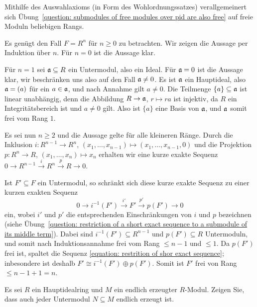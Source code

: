 \begin{remark*}
  Mithilfe des Auswahlaxioms (in Form des Wohlordnungssatzes) verallgemeinert sich Übung~\ref{question: submodules of free modules over pid are also free} auf freie Moduln beliebigen Rangs.
\end{remark*}


\begin{solution}
  Es genügt den Fall $F = R^n$ für $n \geq 0$ zu betrachten.
  Wir zeigen die Aussage per Induktion über $n$.
  Für $n = 0$ ist die Aussage klar.
  
  Für $n = 1$ sei $\mathfrak{a} \subseteq R$ ein Untermodul, also ein Ideal.
  Für $\mathfrak{a} = 0$ ist die Aussage klar, wir beschränken uns also auf den Fall $\mathfrak{a} \neq 0$.
  Es ist $\mathfrak{a}$ ein Hauptideal, also $\mathfrak{a} = (a)$ für ein $a \in \mathfrak{a}$, und nach Annahme gilt $a \neq 0$.
  Die Teilmenge $\{a\} \subseteq \mathfrak{a}$ ist linear unabhängig, denn die Abbildung $R \to \mathfrak{a}$, $r \mapsto ra$ ist injektiv, da $R$ ein Integritätsbereich ist und $a \neq 0$ gilt.
  Also ist $\{a\}$ eine Basis von $\mathfrak{a}$, und $\mathfrak{a}$ somit frei vom Rang $1$.
  
  Es sei nun $n \geq 2$ und die Aussage gelte für alle kleineren Ränge.
  Durch die Inklusion $i \colon R^{n-1} \to R^n$, $(x_1, \dotsc, x_{n-1}) \mapsto (x_1, \dotsc, x_{n-1}, 0)$ und die Projektion $p \colon R^n \to R$, $(x_1, \dotsc, x_n) \mapsto x_n$ erhalten wir eine kurze exakte Sequenz $0 \to R^{n-1} \xrightarrow{i} R^n \xrightarrow{p} R \to 0$.
  
  Ist $F' \subseteq F$ ein Untermodul, so schränkt sich diese kurze exakte Sequenz zu einer kurzen exakten Sequenz
  \begin{equation}
    \label{equation: restrition of shor exact sequence}
    0 \to i^{-1}(F') \xrightarrow{i'} F' \xrightarrow{p'} p(F') \to 0
  \end{equation}
  ein, wobei $i'$ und $p'$ die entsprechenden Einschränkungen von $i$ und $p$ bezeichnen (siehe Übung~\ref{question: restriction of a short exact sequence to a submodule of its middle term}).
  Dabei sind $i^{-1}(F') \subseteq R^{n-1}$ und $p(F') \subseteq R$ Untermoduln, und somit nach Induktionsannahme frei vom Rang $\leq n-1$ und $\leq 1$.
  Da $p(F')$ frei ist, spaltet die Sequenz \eqref{equation: restrition of shor exact sequence};
  inbesondere ist deshalb $F' \cong i^{-1}(F') \oplus p(F')$.
  Somit ist $F'$ frei von Rang $\leq n-1 + 1 = n$.
\end{solution}


\begin{question}
  Es sei $R$ ein Hauptidealring und $M$ ein endlich erzeugter $R$-Modul.
  Zeigen Sie, dass auch jeder Untermodul $N \subseteq M$ endlich erzeugt ist.
\end{question}


